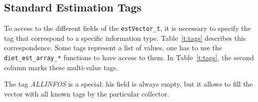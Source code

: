 \subsection{Standard Estimation Tags}\label{sect:estTags}

To access to the different fields of the \texttt{estVector\_t}, it is
necessary to specify the tag that correspond to a specific information
type.  Table~\ref{t:tags} describes this correspondence.  Some tags
represent a list of values, one has to use the
\texttt{diet\_est\_array\_*}  functions to have access to them. In
Table~\ref{t:tags},  the second column marks these multi-value tags.

The tag \textit{ALLINFOS} is a special: his field is 
always empty, but it allows to fill the vector with all known tags 
by the particular collector.
 
